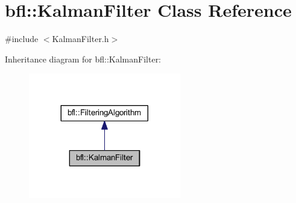 \hypertarget{classbfl_1_1KalmanFilter}{}\section{bfl\+:\+:Kalman\+Filter Class Reference}
\label{classbfl_1_1KalmanFilter}


{\ttfamily \#include $<$Kalman\+Filter.\+h$>$}



Inheritance diagram for bfl\+:\+:Kalman\+Filter\+:
\nopagebreak
\begin{figure}[H]
\begin{center}
\leavevmode
\includegraphics[width=188pt]{classbfl_1_1KalmanFilter__inherit__graph}
\end{center}
\end{figure}
